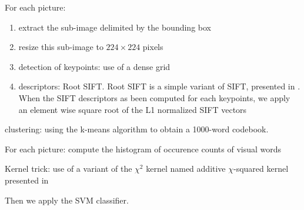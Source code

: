 For each picture:
\begin{enumerate}
    \item extract the sub-image delimited by the bounding box
    \item resize this sub-image to $224 \times 224$ pixels
    \item detection of keypoints: use of a dense grid
    \item descriptors: Root SIFT. Root SIFT is a simple variant of SIFT, presented in \cite{Arandjelovic2012}. When the SIFT descriptors as been computed for each keypoints, we apply an element wise square root of the L1 normalized SIFT vectors
\end{enumerate}

clustering: using the k-means algorithm to obtain a 1000-word codebook.

For each picture:
compute the histogram of occurence counts of visual words

Kernel trick: use of a variant of the $\chi^2$ kernel named additive $\chi$-squared kernel presented in \cite{Vedaldi2010}

Then we apply the SVM classifier.
